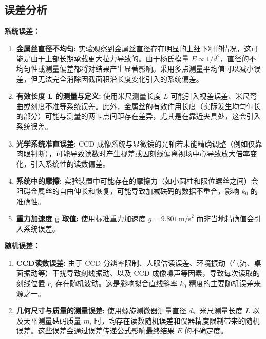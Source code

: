 \documentclass[12pt]{article}
\begin{document}
\subsection{误差分析}
\textbf{系统误差：}
\begin{enumerate}
    \item \textbf{金属丝直径不均匀:} 实验观察到金属丝直径存在明显的上细下粗的情况，这可能是由于上部长期承载更大拉力导致的。由于杨氏模量 $E \propto 1/d^2$，直径的不均匀性或测量偏差都将对结果产生显著影响。采用多点测量平均值可以减小误差，但无法完全消除因截面积沿长度变化引入的系统偏差。
    \item \textbf{有效长度 L 的测量与定义:} 使用米尺测量长度 $L$ 可能引入视差误差、米尺弯曲或刻度不准等系统误差。此外，金属丝的有效作用长度（实际发生均匀伸长的部分）可能与测量的两卡点间距存在差异，尤其是在靠近夹具处，这会引入系统误差。
    \item \textbf{光学系统准直误差:} CCD 成像系统与显微镜的光轴若未能精确调整（例如仅靠肉眼判断），可能导致读数时产生视差或因刻线偏离视场中心导致放大倍率变化，引入系统性的读数偏差。
    \item \textbf{系统中的摩擦:} 实验装置中可能存在的摩擦力（如小圆柱和限位螺丝之间）会阻碍金属丝的自由伸长和恢复，可能导致加减砝码的数据不重合，影响 $k_0$ 的准确性。
    \item \textbf{重力加速度 g 取值:} 使用标准重力加速度 $g=9.801\,\text{m/s}^2$ 而非当地精确值会引入系统误差。
\end{enumerate}
\textbf{随机误差：}
\begin{enumerate}
    \item \textbf{CCD读数误差:} 由于 CCD 分辨率限制、人眼估读误差、环境振动（气流、桌面振动等）干扰导致刻线振动、以及 CCD 成像噪声等因素，导致每次读取的刻线位置 $r_i$ 存在随机波动。这是影响拟合直线斜率 $k_0$ 精度的主要随机误差来源之一。
    \item \textbf{几何尺寸与质量的测量误差:} 使用螺旋测微器测量直径 $d$、米尺测量长度 $L$ 以及天平测量砝码质量 $m_i$ 时，均存在读数随机误差和仪器精度限制带来的随机误差。这些误差会通过误差传递公式影响最终结果 $E$ 的不确定度。
\end{enumerate}
\end{document}
